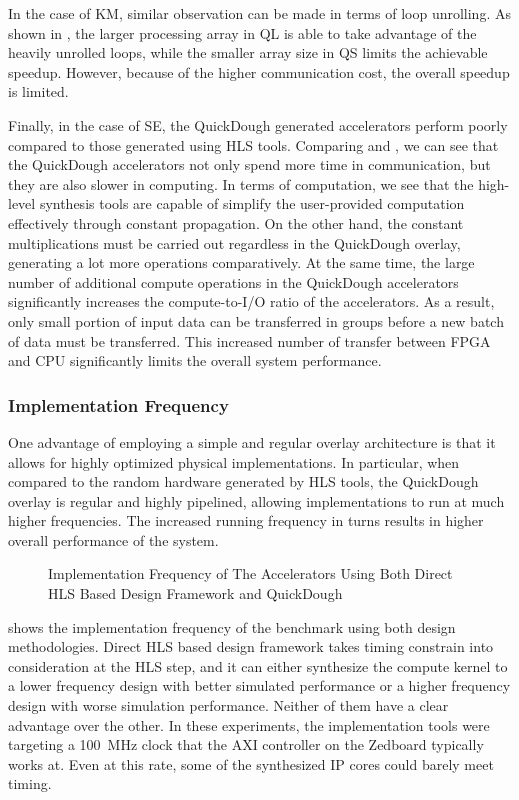 In the case of KM, similar observation can be made in terms of loop unrolling. As shown in
, the larger processing array in QL is able to take advantage of the
heavily unrolled loops, while the smaller array size in QS limits the achievable speedup. However,
because of the higher communication cost, the overall speedup is limited.

Finally, in the case of SE, the QuickDough generated accelerators perform poorly compared to those
generated using HLS tools. Comparing  and , we can
see that the QuickDough accelerators not only spend more time in communication, but they are also
slower in computing. In terms of computation, we see that the high-level synthesis tools are capable
of simplify the user-provided computation effectively through constant propagation. On the other
hand, the constant multiplications must be carried out regardless in the QuickDough overlay,
generating a lot more operations comparatively. At the same time, the large number of additional
compute operations in the QuickDough accelerators significantly increases the compute-to-I/O ratio
of the accelerators. As a result, only small portion of input data can be transferred in groups
before a new batch of data must be transferred. This increased number of transfer between FPGA and
CPU significantly limits the overall system performance.

\subsubsection{Implementation Frequency}
One advantage of employing a simple and regular overlay architecture is that it allows for highly
optimized physical implementations. In particular, when compared to the random hardware generated by
HLS tools, the QuickDough overlay is regular and highly pipelined, allowing implementations to run
at much higher frequencies.  The increased running frequency in turns results in higher overall
performance of the system.


\begin{figure}
\caption{Implementation Frequency of The Accelerators Using Both Direct HLS Based Design Framework and QuickDough}
\label{fig:impl-freq}
\end{figure}

 shows the implementation frequency of the benchmark using both design
methodologies. Direct HLS based design framework takes timing constrain into consideration at the
HLS step, and it can either synthesize the compute kernel to a lower frequency design with better
simulated performance or a higher frequency design with worse simulation performance. Neither of
them have a clear advantage over the other.  In these experiments, the implementation tools were
targeting a \SI{100}{\mega\hertz} clock that the AXI controller on the Zedboard typically works at.
Even at this rate, some of the synthesized IP cores could barely meet timing.

